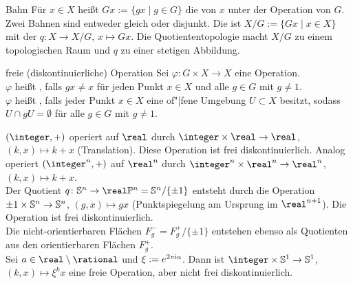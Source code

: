\begin{Def}{Bahn}
    Für $x \in X$ heißt $Gx := \{gx \;|\; g \in G\}$ die  von $x$
    unter der Operation von $G$.
    Zwei Bahnen sind entweder gleich oder disjunkt.
    Die  ist $X/G := \{Gx \;|\; x \in X\}$ mit
    der  $q\colon X \rightarrow X/G$,
    $x \mapsto Gx$.
    Die Quotiententopologie macht $X/G$ zu einem topologischen Raum und
    $q$ zu einer stetigen Abbildung.
\end{Def}

\begin{Def}{freie (diskontinuierliche) Operation}
    Sei $\varphi\colon G \times X \rightarrow X$ eine Operation. \\
    $\varphi$ heißt , falls $gx \not= x$ für jeden Punkt
    $x \in X$ und alle $g \in G$ mit $g \not= 1$. \\
    $\varphi$ heißt , falls jeder Punkt
    $x \in X$ eine of"|fene Umgebung $U \subset X$ besitzt, sodass
    $U \cap gU = \emptyset$ für alle $g \in G$ mit $g \not= 1$.
\end{Def}

\begin{Bsp}
    $(\integer, +)$ operiert auf $\real$ durch
    $\integer \times \real \rightarrow \real$, $(k, x) \mapsto k + x$
    (Translation).
    Diese Operation ist frei diskontinuierlich.
    Analog operiert $(\integer^n, +)$ auf $\real^n$ durch
    $\integer^n \times \real^n \rightarrow \real^n$, $(k, x) \mapsto k + x$. \\
    Der Quotient
    $q\colon \sphere^n \rightarrow \real\projective^n = \sphere^n/\{\pm 1\}$
    entsteht durch die Operation
    ${\pm 1} \times \mathbb{S}^n \rightarrow \mathbb{S}^n$, $(g, x) \mapsto gx$
    (Punktspiegelung am Ursprung im $\real^{n+1}$).
    Die Operation ist frei diskontinuierlich. \\
    Die nicht-orientierbaren Flächen $F_g^- = F_g^+/\{\pm 1\}$ entstehen
    ebenso als Quotienten aus den orientierbaren Flächen $F_g^+$. \\
    Sei $a \in \real \setminus \rational$ und $\xi := e^{2\pi\mathrm{i} a}$.
    Dann ist $\integer \times \sphere^1 \rightarrow \sphere^1$,
    $(k, x) \mapsto \xi^k x$ eine freie Operation, aber nicht
    frei diskontinuierlich.
\end{Bsp}

\linie


